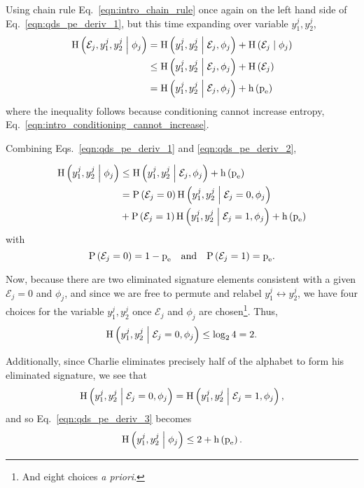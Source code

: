 \noindent Using chain rule Eq.~\ref{eqn:intro_chain_rule} once again on the left hand side of Eq.~\ref{eqn:qds_pe_deriv_1}, but this time expanding over variable $y_1^j, y_2^j$,
\begin{align}\label{eqn:qds_pe_deriv_2}
\text{H}\left( \mathcal{E}_j, y_1^j, y_2^j \; \middle| \; \phi_j \right) &=
\text{H}\left(y_1^j, y_2^j \; \middle| \; \mathcal{E}_j, \phi_j\right) + \text{H}\left(\mathcal{E}_j \; \middle| \; \phi_j\right) \notag \\
&\le \text{H}\left(y_1^j, y_2^j \; \middle| \; \mathcal{E}_j, \phi_j\right) + \text{H}\left(\mathcal{E}_j\right) \notag \\
&= \text{H}\left(y_1^j, y_2^j \; \middle| \; \mathcal{E}_j, \phi_j\right) + \text{h}\left(\text{p}_{\text{e}}\right)
\end{align}
where the inequality follows because conditioning cannot increase entropy, Eq.~\ref{eqn:intro_conditioning_cannot_increase}.

Combining Eqs.~\ref{eqn:qds_pe_deriv_1} and \ref{eqn:qds_pe_deriv_2},

\begin{align}\label{eqn:qds_pe_deriv_3}
\text{H}\left(y_1^j, y_2^j \; \middle| \; \phi_j\right) &\le \text{H}\left(y_1^j, y_2^j \; \middle| \; \mathcal{E}_j, \phi_j\right) + \text{h}\left(\text{p}_{\text{e}}\right) \notag \\
&= \text{P}\left(\mathcal{E}_j=0\right) \text{H}\left(y_1^j, y_2^j \; \middle| \; \mathcal{E}_j=0, \phi_j\right) \notag \\
&+ \text{P}\left(\mathcal{E}_j=1\right) \text{H}\left(y_1^j, y_2^j \; \middle| \; \mathcal{E}_j=1, \phi_j\right) + \text{h}\left(\text{p}_{\text{e}}\right)
\end{align}
with
\begin{equation}
\text{P}\left(\mathcal{E}_j=0\right) = 1 - \pe \qq{and} \text{P}\left(\mathcal{E}_j=1\right) = \pe.
\end{equation}

\noindent Now, because there are two eliminated signature elements consistent with a given $\mathcal{E}_j=0$ and $\phi_j$, and since we are free to permute and relabel $y_1^j \leftrightarrow y_2^j$, we have four choices for the variable $y_1^j, y_2^j$ once $\mathcal{E}_j$ and $\phi_j$ are chosen\footnote{And eight choices \emph{a priori}.}. Thus,
\begin{equation}
\text{H}\left(y_1^j, y_2^j \; \middle| \; \mathcal{E}_j=0, \phi_j\right) \le \log_2 4 = 2.
\end{equation}

\noindent Additionally, since Charlie eliminates precisely half of the alphabet to form his eliminated signature, we see that
\begin{equation}
\text{H}\left(y_1^j, y_2^j \; \middle| \; \mathcal{E}_j=0, \phi_j\right) = \text{H}\left(y_1^j, y_2^j \; \middle| \; \mathcal{E}_j=1, \phi_j\right),
\end{equation}
and so Eq.~\ref{eqn:qds_pe_deriv_3} becomes
\begin{equation}\label{eqn:qds_pe_deriv_4}
\text{H}\left(y_1^j, y_2^j \; \middle| \; \phi_j\right) \le 2 + \text{h}\left(\text{p}_{\text{e}}\right).
\end{equation}

